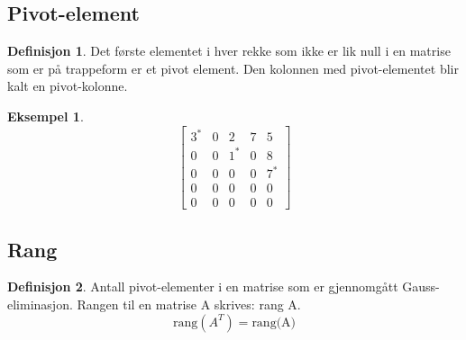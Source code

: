 \documentclass[11pt]{article}
\theoremstyle{definition}
\newtheorem{mindef}{Definisjon}[section]
\newenvironment{fmindef}
{\begin{mdframed}[style=minstil]\begin{mindef}}
		{\end{mindef}\end{mdframed}}
\theoremstyle{definition}
\newtheorem{mitteks}{Eksempel}[section]
\theoremstyle{definition}
\theoremstyle{definition}
\theoremstyle{definition}
\theoremstyle{definition}
\begin{document}
		\newpage
		
		\subsection{Pivot-element}
		
		\begin{fmindef}
			Det første elementet i hver rekke som ikke er lik null i en matrise som er på trappeform er et pivot element. Den kolonnen med pivot-elementet blir kalt en pivot-kolonne.
		\end{fmindef}
		
		\begin{mitteks}
			\[
			\left[\begin{array}{lllll} 
				3^* & 0 & 2 & 7 & 5\\
				0 & 0 & 1^* & 0 & 8\\
				0 & 0 & 0 & 0 & 7^* \\
				0 & 0 & 0 & 0 & 0 \\
				0 & 0 & 0 & 0 & 0 
			\end{array} \right]\]
		\end{mitteks}
		
		\subsection{Rang}
		
		\begin{fmindef}
			Antall pivot-elementer i en matrise som er gjennomgått Gauss-eliminasjon. Rangen til en matrise A skrives: rang A.
			\[\text{rang}(A^T)=\text{rang(A)} \]
		\end{fmindef}
		
\end{document}
